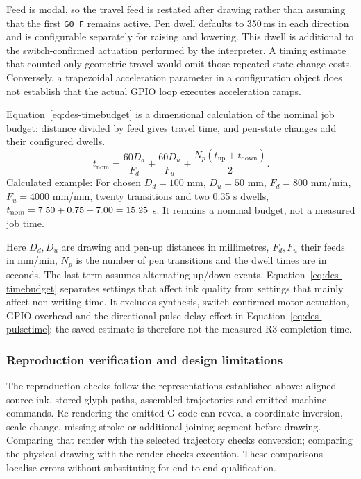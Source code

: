 Feed is modal, so the travel feed is restated after drawing rather than assuming that the first \texttt{G0 F} remains active. Pen dwell defaults to 350\,ms in each direction and is configurable separately for raising and lowering. This dwell is additional to the switch-confirmed actuation performed by the interpreter. A timing estimate that counted only geometric travel would omit those repeated state-change costs. Conversely, a trapezoidal acceleration parameter in a configuration object does not establish that the actual GPIO loop executes acceleration ramps.

Equation~\ref{eq:des-timebudget} is a dimensional calculation of the nominal job budget: distance divided by feed gives travel time, and pen-state changes add their configured dwells.
\begin{equation}
t_{\mathrm{nom}}=\frac{60D_d}{F_d}+\frac{60D_u}{F_u}
+\frac{N_p(t_{\mathrm{up}}+t_{\mathrm{down}})}{2}.
\label{eq:des-timebudget}
\end{equation}
Calculated example: For chosen $D_d=100$ mm, $D_u=50$ mm, $F_d=800$ mm/min, $F_u=4000$ mm/min, twenty transitions and two 0.35 s dwells, $t_{\rm nom}=7.50+0.75+7.00=15.25$ s. It remains a nominal budget, not a measured job time.

Here $D_d,D_u$ are drawing and pen-up distances in millimetres, $F_d,F_u$ their feeds in mm/min, $N_p$ is the number of pen transitions and the dwell times are in seconds. The last term assumes alternating up/down events. Equation~\ref{eq:des-timebudget} separates settings that affect ink quality from settings that mainly affect non-writing time. It excludes synthesis, switch-confirmed motor actuation, GPIO overhead and the directional pulse-delay effect in Equation~\ref{eq:des-pulsetime}; the saved estimate is therefore not the measured R3 completion time.

\subsubsection{Reproduction verification and design limitations}
The reproduction checks follow the representations established above: aligned source ink, stored glyph paths, assembled trajectories and emitted machine commands. Re-rendering the emitted G-code can reveal a coordinate inversion, scale change, missing stroke or additional joining segment before drawing. Comparing that render with the selected trajectory checks conversion; comparing the physical drawing with the render checks execution. These comparisons localise errors without substituting for end-to-end qualification.


